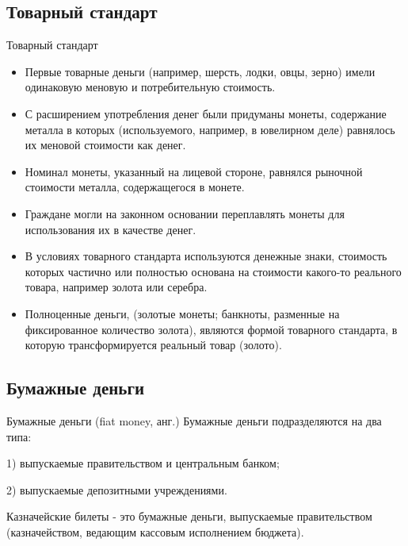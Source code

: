 \documentclass[_DKB_p1_Money.tex]{subfiles}
\begin{document}
\subsection{Товарный стандарт}
\begin{frame}[allowframebreaks]{Товарный стандарт}
\begin{itemize}
\item
Первые товарные деньги (например, шерсть, лодки, овцы, зерно) имели одинаковую меновую и потребительную стоимость.

\item
С расширением употребления денег были придуманы монеты, содержание металла в которых (используемого, например, в ювелирном деле) равнялось их меновой стоимости как денег. 

\item
Номинал монеты, указанный на лицевой стороне, равнялся рыночной стоимости металла, содержащегося в монете. 

\item
Граждане могли на законном основании переплавлять монеты для использования их в качестве денег.

\pagebreak
\item
В условиях товарного стандарта используются денежные знаки, стоимость которых частично или полностью основана на стоимости какого-то реального товара, например золота или серебра. 

\item
Полноценные деньги, (золотые монеты; банкноты, разменные на фиксированное количество золота), являются формой товарного стандарта, в которую трансформируется реальный товар (золото). 

\end{itemize}
\end{frame}
\subsection{Бумажные деньги}
\begin{frame}{Бумажные деньги (fiat money, анг.)}
Бумажные деньги подразделяются на два типа: 

1) выпускаемые правительством и центральным банком;

2) выпускаемые депозитными учреждениями.
\begin{block}{Казначейские билеты}
\quad
- это бумажные деньги, выпускаемые правительством (казначейством, ведающим кассовым исполнением бюджета).
\end{block}
\end{frame}
\end{document}

